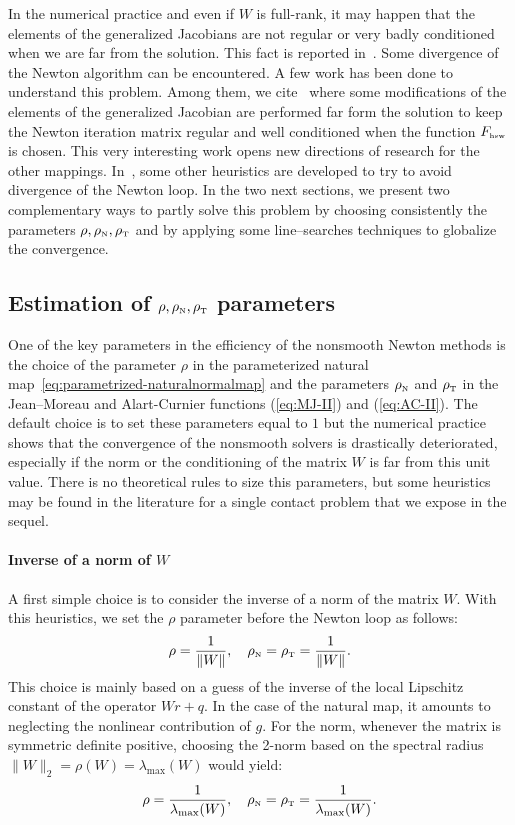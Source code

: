 In the numerical practice and even if $W$ is full-rank, it may happen that the elements of the generalized Jacobians are not regular or very badly conditioned when we are far from the solution. This fact is reported in~\cite{Alart1993,Alart95,Jourdan.Alart.ea98,Hueber.ea_SJSC2008,Koziara.Bicanic_CMAME2008}. Some divergence of the Newton algorithm can be encountered. A few work has been done to understand this problem. Among them, we cite~\cite{Hueber.ea_SJSC2008} where some modifications of the elements of the generalized Jacobian are performed far form the solution to keep the Newton iteration matrix regular and well conditioned when the function $F_{\hbox{\tiny{hsw}}}$ is chosen. This very interesting work opens new directions of research for the other mappings. In~\cite{Koziara.Bicanic_CMAME2008}, some other heuristics are developed to try to avoid divergence of the Newton loop. In the two next sections, we present two complementary ways to partly solve this problem by choosing consistently the parameters $\rho, \rho_{\hbox{\tiny{N}}}, \rho_{\hbox{\tiny{T}}}$ and by applying some line--searches techniques to globalize the convergence.


\subsection{Estimation of $\rho, \rho_{\hbox{\tiny{N}}}, \rho_{\hbox{\tiny{T}}}$ parameters}

One of the key parameters in the efficiency of the nonsmooth Newton methods is the choice of the parameter $\rho$ in the parameterized natural map~\eqref{eq:parametrized-naturalnormalmap} and the parameters  $\rho_{\hbox{\tiny{N}}}$ and $\rho_{\hbox{\tiny{T}}}$ in the Jean--Moreau and Alart-Curnier functions (\ref{eq:MJ-II}) and (\ref{eq:AC-II}). The default choice is to set these parameters equal to $1$ but the numerical practice shows  that the convergence of the nonsmooth solvers is drastically deteriorated, especially  if the norm or the conditioning of the matrix $W$ is far from this unit value. There is no theoretical rules to size this parameters, but some heuristics may be found in the literature for a single contact problem that we expose in the sequel.

\paragraph{Inverse of a norm of $W$} A first simple choice is to consider the inverse of a norm of the matrix $W$. With this heuristics, we set the $\rho$ parameter before the Newton loop as follows:
\begin{equation}
  \label{eq:rho-1}
  \rho = \frac 1 {\|W\|}, \quad  \rho_\n =  \rho_\t = \frac 1 {\|W\|}.
\end{equation}
This choice is mainly based on a guess of the inverse of the local Lipschitz constant of the operator $Wr+q$. In the case of the natural map, it amounts to neglecting the nonlinear contribution of $g$.
For the norm, whenever the matrix is symmetric definite positive, choosing the 2-norm based on the spectral radius $\|W\|_2= \rho(W) =\lambda_{\max}(W)$ would yield:
\begin{equation}
  \label{eq:rho-2}
  \rho = \frac 1 {\lambda_{\max}(W)}, \quad  \rho_\n = \rho_\t = \frac 1 {\lambda_{\max}(W)}.
\end{equation}

